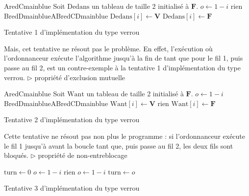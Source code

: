 \begin{algorithm}[H]
	\centering
	\begin{algorithmic}[1]
		\MarkedState A{red}\quad\Mark C{mainblue} Soit $\mathrm{Dedans}$\/ un tableau de taille 2 initialisé à $\mathbf{F}$.
		 
		\State $o \gets 1 - i$ 
		\State rien
		\EndWhile\Mark B{red}\quad\Mark D{mainblue}\ConnectStates AB{red}\ConnectStates CD{mainblue}
		\State $\mathrm{Dedans}[i] \gets \mathbf{V}$
		\EndProcedure
		\State $\mathrm{Dedans}[i] \gets \mathbf{F}$
		\EndProcedure
	\end{algorithmic}
	\caption{Tentative 1 d'implémentation du type \textsf{verrou}}
\end{algorithm}

Mais, cet tentative ne résout pas le problème. En effet, l'exécution où l'ordonnanceur exécute l'algorithme jusqu'à la fin de tant que pour le fil 1, puis passe au fil 2, est un contre-exemple à la tentative 1 d'implémentation du type \textsf{verrou}. $\triangleright$ propriété d'exclusion mutuelle

\begin{algorithm}[H]
	\centering
	\begin{algorithmic}[1]
		\MarkedState A{red}\quad\Mark C{mainblue} Soit $\mathrm{Want}$\/ un tableau de taille 2 initialisé à $\mathbf{F}$.
		 
		\State $o \gets 1 - i$ 
		\State \Mark B{red}\quad\Mark D{mainblue}\ConnectStates AB{red}\ConnectStates CD{mainblue} $\mathrm{Want}[i] \gets \mathbf{V}$
		\State rien
		\EndWhile
		\EndProcedure
		\State $\mathrm{Want}[i] \gets \mathbf{F}$
		\EndProcedure
	\end{algorithmic}
	\caption{Tentative 2 d'implémentation du type \textsf{verrou}}
\end{algorithm}

Cette tentative ne résout pas non plus le programme : si l'ordonnanceur exécute le fil 1 jusqu'à avant la boucle tant que, puis passe au fil 2, les deux fils sont bloqués. $\triangleright$ propriété de non-entreblocage

\begin{algorithm}[H]
	\centering
	\begin{algorithmic}[1]
		\State $\mathrm{turn}\gets 0$ 
		\State $o \gets 1 - i$
		\State rien
		\EndWhile
		\EndProcedure
		\State $o \gets 1 - i$
		\State $\mathrm{turn} \gets o$
		\EndProcedure
	\end{algorithmic}
	\caption{Tentative 3 d'implémentation du type \textsf{verrou}}
\end{algorithm}

